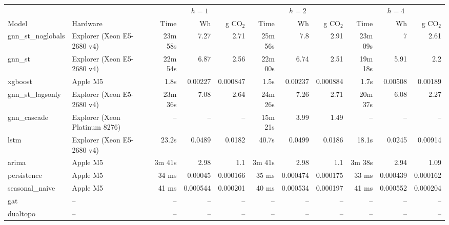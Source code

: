 \begin{tabular}{llrrrrrrrrr}
\toprule
 & & \multicolumn{3}{c}{$h=1$} & \multicolumn{3}{c}{$h=2$} & \multicolumn{3}{c}{$h=4$} \\
\cmidrule(lr){3-5} \cmidrule(lr){6-8} \cmidrule(lr){9-11}
Model & Hardware & Time & Wh & g CO$_2$ & Time & Wh & g CO$_2$ & Time & Wh & g CO$_2$ \\
\midrule
gnn\_st\_noglobals & Explorer (Xeon E5-2680 v4) & 23m 58s & 7.27 & 2.71 & 25m 56s & 7.8 & 2.91 & 23m 09s & 7 & 2.61 \\
gnn\_st & Explorer (Xeon E5-2680 v4) & 22m 54s & 6.87 & 2.56 & 22m 00s & 6.74 & 2.51 & 19m 18s & 5.91 & 2.2 \\
xgboost & Apple M5 & 1.8s & 0.00227 & 0.000847 & 1.5s & 0.00237 & 0.000884 & 1.7s & 0.00508 & 0.00189 \\
gnn\_st\_lagsonly & Explorer (Xeon E5-2680 v4) & 23m 36s & 7.08 & 2.64 & 24m 26s & 7.26 & 2.71 & 20m 37s & 6.08 & 2.27 \\
gnn\_cascade & Explorer (Xeon Platinum 8276) & -- & -- & -- & 15m 21s & 3.99 & 1.49 & -- & -- & -- \\
lstm & Explorer (Xeon E5-2680 v4) & 23.2s & 0.0489 & 0.0182 & 40.7s & 0.0499 & 0.0186 & 18.1s & 0.0245 & 0.00914 \\
arima & Apple M5 & 3m 41s & 2.98 & 1.1 & 3m 41s & 2.98 & 1.1 & 3m 38s & 2.94 & 1.09 \\
persistence & Apple M5 & 34 ms & 0.00045 & 0.000166 & 35 ms & 0.000474 & 0.000175 & 33 ms & 0.000439 & 0.000162 \\
seasonal\_naive & Apple M5 & 41 ms & 0.000544 & 0.000201 & 40 ms & 0.000534 & 0.000197 & 41 ms & 0.000552 & 0.000204 \\
gat & – & -- & -- & -- & -- & -- & -- & -- & -- & -- \\
dualtopo & – & -- & -- & -- & -- & -- & -- & -- & -- & -- \\
\bottomrule
\end{tabular}
